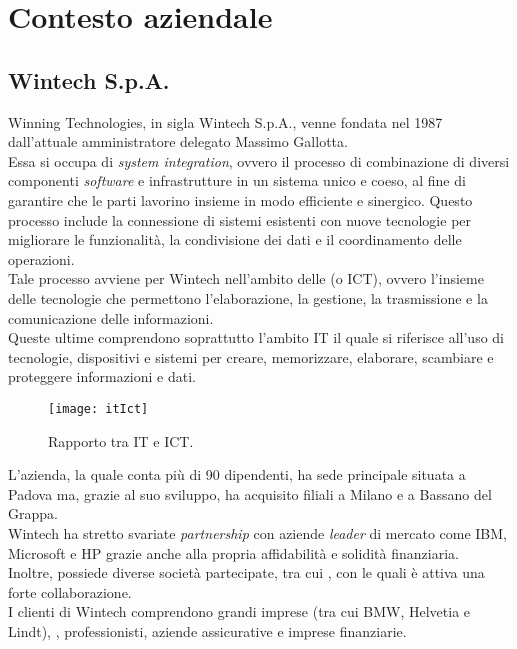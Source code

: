 \chapter{Contesto aziendale}
\label{cap:contestoAziendale}

\section{Wintech S.p.A.}
\noindent Winning Technologies, in sigla Wintech S.p.A., venne fondata nel 1987 dall'attuale amministratore delegato Massimo Gallotta.\\
Essa si occupa di \emph{system integration}, ovvero il processo di combinazione di diversi componenti \emph{software} e infrastrutture in un sistema unico e coeso, al fine di garantire che le parti lavorino insieme in modo efficiente e sinergico. Questo processo include la connessione di sistemi esistenti con nuove tecnologie per migliorare le funzionalità, la condivisione dei dati e il coordinamento delle operazioni.\\ 
Tale processo avviene per Wintech nell'ambito delle  (o ICT), ovvero l'insieme delle tecnologie che permettono l'elaborazione, la gestione, la trasmissione e la comunicazione delle informazioni.\\
Queste ultime comprendono soprattutto l'ambito \gls{IT} il quale si riferisce all'uso di tecnologie, dispositivi e sistemi per creare, memorizzare, elaborare, scambiare e proteggere informazioni e dati.\\
\begin{figure}[htbp] 
    \centering 
    \texttt{[image: itIct]} 
    \caption{Rapporto tra IT e ICT.}
    \label{fig:itIct}
\end{figure}
\noindent L'azienda, la quale conta più di 90 dipendenti, ha sede principale situata a Padova ma, grazie al suo sviluppo, ha acquisito filiali a Milano e a Bassano del Grappa.\\
Wintech ha stretto svariate \emph{partnership} con aziende \emph{leader} di mercato come IBM, Microsoft e HP grazie anche alla propria affidabilità e solidità finanziaria.\\ 
Inoltre, possiede diverse società partecipate, tra cui , con le quali è attiva una forte collaborazione.\\
I clienti di Wintech comprendono grandi imprese (tra cui BMW, Helvetia e Lindt), , professionisti, aziende assicurative e imprese finanziarie.\\

